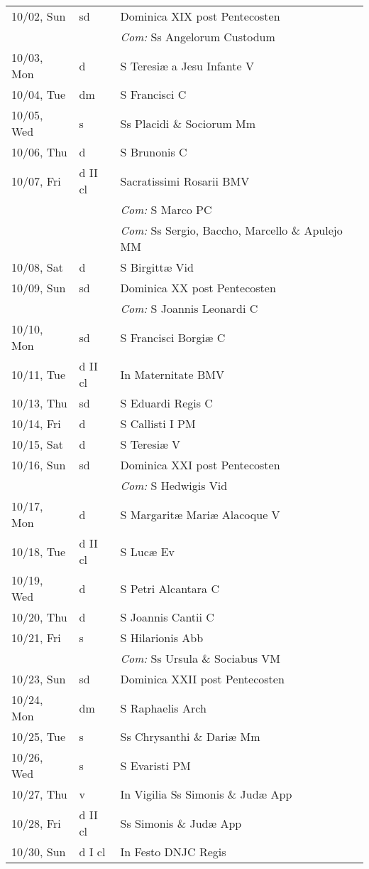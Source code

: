 \documentclass[10pt]{article}
\begin{document}
\begin{longtable}{ l l l }
10/02, Sun & sd & Dominica XIX post Pentecosten\\
 & & \textit{Com:} Ss Angelorum Custodum\\
10/03, Mon & d & S Teresiæ a Jesu Infante V\\
10/04, Tue & dm & S Francisci C\\
10/05, Wed & s & Ss Placidi \& Sociorum Mm\\
10/06, Thu & d & S Brunonis C\\
10/07, Fri & d II cl & Sacratissimi Rosarii BMV\\
 & & \textit{Com:} S Marco PC\\
 & & \textit{Com:} Ss Sergio, Baccho, Marcello \& Apulejo MM\\
10/08, Sat & d & S Birgittæ Vid\\
10/09, Sun & sd & Dominica XX post Pentecosten\\
 & & \textit{Com:} S Joannis Leonardi C\\
10/10, Mon & sd & S Francisci Borgiæ C\\
10/11, Tue & d II cl & In Maternitate BMV\\
10/13, Thu & sd & S Eduardi Regis C\\
10/14, Fri & d & S Callisti I PM\\
10/15, Sat & d & S Teresiæ V\\
10/16, Sun & sd & Dominica XXI post Pentecosten\\
 & & \textit{Com:} S Hedwigis Vid\\
10/17, Mon & d & S Margaritæ Mariæ Alacoque V\\
10/18, Tue & d II cl & S Lucæ Ev\\
10/19, Wed & d & S Petri Alcantara C\\
10/20, Thu & d & S Joannis Cantii C\\
10/21, Fri & s & S Hilarionis Abb\\
 & & \textit{Com:} Ss Ursula \& Sociabus VM\\
10/23, Sun & sd & Dominica XXII post Pentecosten\\
10/24, Mon & dm & S Raphaelis Arch\\
10/25, Tue & s & Ss Chrysanthi \& Dariæ Mm\\
10/26, Wed & s & S Evaristi PM\\
10/27, Thu & v & In Vigilia Ss Simonis \& Judæ App\\
10/28, Fri & d II cl & Ss Simonis \& Judæ App\\
10/30, Sun & d I cl & In Festo DNJC Regis\\

\end{longtable}
\end{document}
